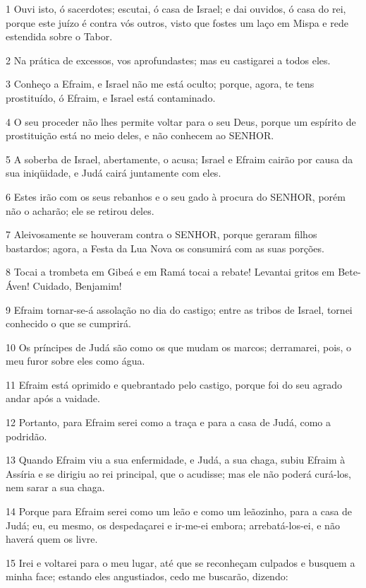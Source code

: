 \par 1 Ouvi isto, ó sacerdotes; escutai, ó casa de Israel; e dai ouvidos, ó casa do rei, porque este juízo é contra vós outros, visto que fostes um laço em Mispa e rede estendida sobre o Tabor.
\par 2 Na prática de excessos, vos aprofundastes; mas eu castigarei a todos eles.
\par 3 Conheço a Efraim, e Israel não me está oculto; porque, agora, te tens prostituído, ó Efraim, e Israel está contaminado.
\par 4 O seu proceder não lhes permite voltar para o seu Deus, porque um espírito de prostituição está no meio deles, e não conhecem ao SENHOR.
\par 5 A soberba de Israel, abertamente, o acusa; Israel e Efraim cairão por causa da sua iniqüidade, e Judá cairá juntamente com eles.
\par 6 Estes irão com os seus rebanhos e o seu gado à procura do SENHOR, porém não o acharão; ele se retirou deles.
\par 7 Aleivosamente se houveram contra o SENHOR, porque geraram filhos bastardos; agora, a Festa da Lua Nova os consumirá com as suas porções.
\par 8 Tocai a trombeta em Gibeá e em Ramá tocai a rebate! Levantai gritos em Bete-Áven! Cuidado, Benjamim!
\par 9 Efraim tornar-se-á assolação no dia do castigo; entre as tribos de Israel, tornei conhecido o que se cumprirá.
\par 10 Os príncipes de Judá são como os que mudam os marcos; derramarei, pois, o meu furor sobre eles como água.
\par 11 Efraim está oprimido e quebrantado pelo castigo, porque foi do seu agrado andar após a vaidade.
\par 12 Portanto, para Efraim serei como a traça e para a casa de Judá, como a podridão.
\par 13 Quando Efraim viu a sua enfermidade, e Judá, a sua chaga, subiu Efraim à Assíria e se dirigiu ao rei principal, que o acudisse; mas ele não poderá curá-los, nem sarar a sua chaga.
\par 14 Porque para Efraim serei como um leão e como um leãozinho, para a casa de Judá; eu, eu mesmo, os despedaçarei e ir-me-ei embora; arrebatá-los-ei, e não haverá quem os livre.
\par 15 Irei e voltarei para o meu lugar, até que se reconheçam culpados e busquem a minha face; estando eles angustiados, cedo me buscarão, dizendo:

